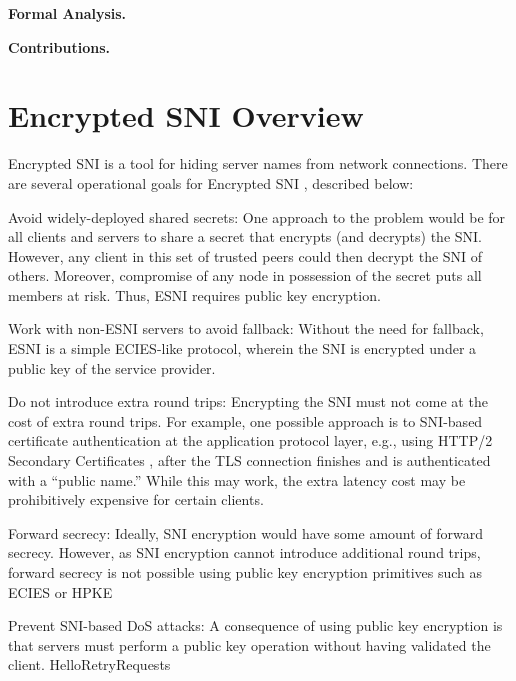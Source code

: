 \documentclass[twoside]{article}
\theoremstyle{definition}
\begin{document}
\textbf{Formal Analysis.} 

\textbf{Contributions.} 

\section{Encrypted SNI Overview}


Encrypted SNI is a tool for hiding server names from network connections. There are several operational goals 
for Encrypted SNI \cite{requirements}, described below:
%
\begin{compactitem}
  \item Avoid widely-deployed shared secrets: One approach to the problem would be for all
  clients and servers to share a secret that encrypts (and decrypts) the SNI. However, any 
  client in this set of trusted peers could then decrypt the SNI of others. Moreover, compromise
  of any node in possession of the secret puts all members at risk. Thus, ESNI requires 
  public key encryption.
  \item Work with non-ESNI servers to avoid fallback: Without the need for fallback, ESNI 
  is a simple ECIES-like protocol, wherein the SNI is encrypted under a public key of the 
  service provider.
  \item Do not introduce extra round trips: Encrypting the SNI must not come at the cost of 
  extra round trips. For example, one possible approach is to SNI-based certificate authentication
  at the application protocol layer, e.g., using HTTP/2 Secondary Certificates \cite{xxx}, after
  the TLS connection finishes and is authenticated with a ``public name.'' While this may work,
  the extra latency cost may be prohibitively expensive for certain clients.
  \item Forward secrecy: Ideally, SNI encryption would have some amount of forward secrecy.
  However, as SNI encryption cannot introduce additional round trips, forward secrecy is not
  possible using public key encryption primitives such as ECIES \cite{XXX} or HPKE \cite{XXX}
  \item Prevent SNI-based DoS attacks: A consequence of using public key encryption is that
  servers must perform a public key operation without having validated the client. HelloRetryRequests

\end{compactitem}
\end{document}
